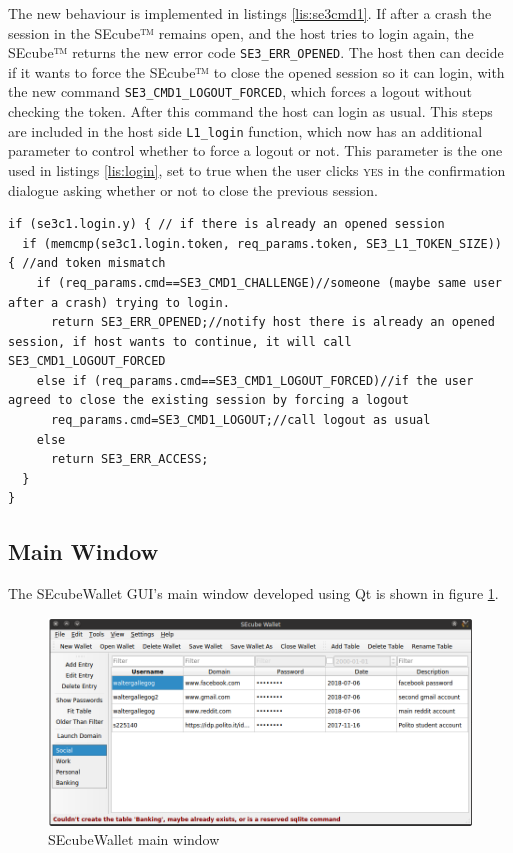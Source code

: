 The new behaviour is implemented in listings \ref{lis:se3cmd1}.
If after a crash the session in the SEcube™ remains open, and the host tries to login again, the SEcube™ returns the new error code \texttt{SE3\_ERR\_OPENED}. The host then can decide if it wants to force the SEcube™ to close the opened session so it can login, with the new command \texttt{SE3\_CMD1\_LOGOUT\_FORCED}, which forces a logout without checking the token. After this command the host can login as usual. This steps are included in the host side \texttt{L1\_login} function, which now has an additional parameter to control whether to force a logout or not. This parameter is the one used in listings \ref{lis:login}, set to true when the user clicks \textsc{yes} in the confirmation dialogue asking whether or not to close the previous session.

\begin{lstlisting}[style=customc, float=htb, caption={Modification in SEcube™ Firmware, file se3\_cmd1.c}, label = {lis:se3cmd1}]
if (se3c1.login.y) { // if there is already an opened session
  if (memcmp(se3c1.login.token, req_params.token, SE3_L1_TOKEN_SIZE)) { //and token mismatch
    if (req_params.cmd==SE3_CMD1_CHALLENGE)//someone (maybe same user after a crash) trying to login.
      return SE3_ERR_OPENED;//notify host there is already an opened session, if host wants to continue, it will call SE3_CMD1_LOGOUT_FORCED
    else if (req_params.cmd==SE3_CMD1_LOGOUT_FORCED)//if the user agreed to close the existing session by forcing a logout
      req_params.cmd=SE3_CMD1_LOGOUT;//call logout as usual  
    else
      return SE3_ERR_ACCESS;
  }
}
\end{lstlisting}




\subsection{Main Window}

The SEcubeWallet GUI's main window developed using Qt is shown in figure \ref{fig:mainWindow}.

\begin{figure}[htb]
  \centering
  \captionsetup{justification=centering}
  \centerline{\includegraphics[width=1\columnwidth]{chapters/figures/development/mainWindow.png}}
  \caption{SEcubeWallet main window}
  \label{fig:mainWindow}
\end{figure}

